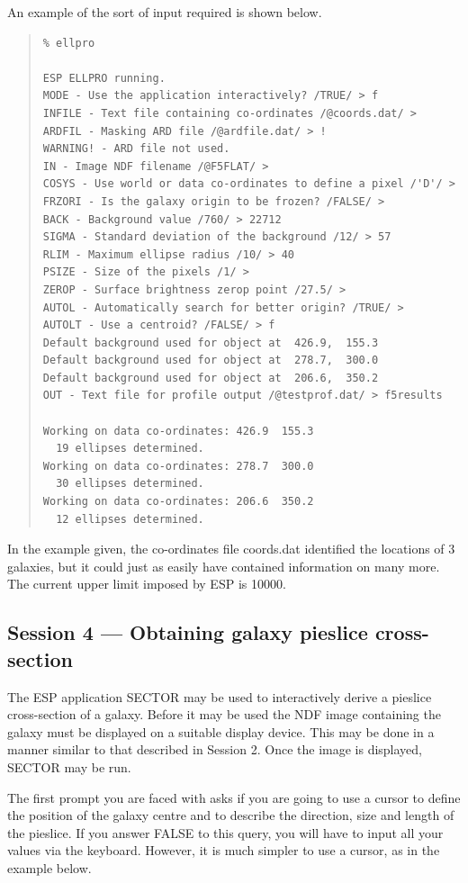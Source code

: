 \documentclass[twoside,11pt]{article}
\newcommand{\xlabel}[1]{}
\newenvironment{myquote}{\begin{quote}\begin{small}}{\end{small}\end{quote}}
\begin{document}
An example of the sort of input required is shown below.

\begin{myquote}
\begin{verbatim}
% ellpro
 
ESP ELLPRO running.
MODE - Use the application interactively? /TRUE/ > f
INFILE - Text file containing co-ordinates /@coords.dat/ > 
ARDFIL - Masking ARD file /@ardfile.dat/ > !
WARNING! - ARD file not used.
IN - Image NDF filename /@F5FLAT/ > 
COSYS - Use world or data co-ordinates to define a pixel /'D'/ > 
FRZORI - Is the galaxy origin to be frozen? /FALSE/ > 
BACK - Background value /760/ > 22712
SIGMA - Standard deviation of the background /12/ > 57
RLIM - Maximum ellipse radius /10/ > 40
PSIZE - Size of the pixels /1/ > 
ZEROP - Surface brightness zerop point /27.5/ > 
AUTOL - Automatically search for better origin? /TRUE/ > 
AUTOLT - Use a centroid? /FALSE/ > f
Default background used for object at  426.9,  155.3 
Default background used for object at  278.7,  300.0 
Default background used for object at  206.6,  350.2 
OUT - Text file for profile output /@testprof.dat/ > f5results
 
Working on data co-ordinates: 426.9  155.3
  19 ellipses determined.
Working on data co-ordinates: 278.7  300.0
  30 ellipses determined.
Working on data co-ordinates: 206.6  350.2
  12 ellipses determined.
\end{verbatim}
\end{myquote}

In the example given, the co-ordinates file coords.dat identified the
locations of 3 galaxies, but it could just as 
easily have contained information on many more. The current 
upper limit imposed by ESP is 10000. 


\subsection{Session 4 --- Obtaining galaxy pieslice cross-section}
\xlabel{SESSION4}

The ESP application SECTOR may be used to interactively derive a
pieslice cross-section of a galaxy. Before it may be used the 
NDF image containing the galaxy must be displayed on a suitable
display device. This may be done in a manner similar to
that described in Session 2. Once the image is displayed, SECTOR 
may be run.

The first prompt you are faced with asks if you are going to use a cursor
to define the position of the galaxy centre and to describe the 
direction, size and length of the pieslice. If you answer FALSE to this query,
you will have to input all your values via the keyboard. However, it is much
simpler to use a cursor, as in the example below.
\end{document}

